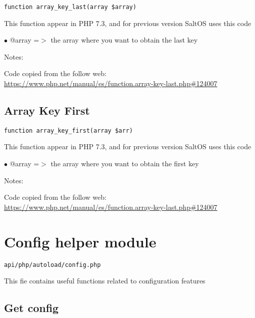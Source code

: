 \documentclass[a4paper]{book}
\def\htmladdnormallink#1#2{\href{#2}{#1}}
\begin{document}
\begin{lstlisting}
function array_key_last(array $array)
\end{lstlisting}

This function appear in PHP 7.3, and for previous version SaltOS
uses this code

\begin{compactitem}
\item[\color{myblue}$\bullet$] @array =$>$ the array where you want to obtain the last key
\end{compactitem}

Notes:

Code copied from the follow web:
\htmladdnormallink{https://www.php.net/manual/es/function.array-key-last.php\#124007}{https://www.php.net/manual/es/function.array-key-last.php\#124007}

\hypertarget{toc53}{}
\subsection{Array Key First}

\begin{lstlisting}
function array_key_first(array $arr)
\end{lstlisting}

This function appear in PHP 7.3, and for previous version SaltOS
uses this code

\begin{compactitem}
\item[\color{myblue}$\bullet$] @array =$>$ the array where you want to obtain the first key
\end{compactitem}

Notes:

Code copied from the follow web:
\htmladdnormallink{https://www.php.net/manual/es/function.array-key-last.php\#124007}{https://www.php.net/manual/es/function.array-key-last.php\#124007}

\hypertarget{toc54}{}
\section{Config helper module}

\begin{lstlisting}
api/php/autoload/config.php
\end{lstlisting}

This fie contains useful functions related to configuration features

\hypertarget{toc55}{}
\subsection{Get config}
\end{document}
